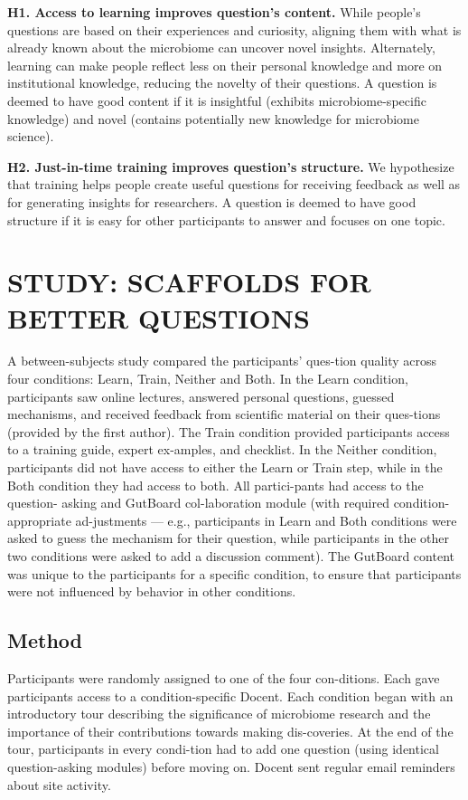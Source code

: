 \textbf{H1. Access to learning improves question’s content.}
While people’s questions are based on their experiences and curiosity, aligning them with what is already known about the microbiome can uncover novel insights. Alternately, learning can make people reflect less on their personal knowledge and more on institutional knowledge, reducing the novelty of their questions. A question is deemed to have good content if it is insightful (exhibits microbiome-specific knowledge) and novel (contains potentially new knowledge for microbiome science).

\textbf{H2. Just-in-time training improves question’s structure.}
We hypothesize that training helps people create useful questions for receiving feedback as well as for generating insights for researchers. A question is deemed to have good structure if it is easy for other participants to answer and focuses on one topic.

\section{STUDY: SCAFFOLDS FOR BETTER QUESTIONS}
A between-subjects study compared the participants’ ques-tion quality across four conditions: Learn, Train, Neither and Both. In the Learn condition, participants saw online lectures, answered personal questions, guessed mechanisms, and received feedback from scientific material on their ques-tions (provided by the first author). The Train condition provided participants access to a training guide, expert ex-amples, and checklist. In the Neither condition, participants did not have access to either the Learn or Train step, while in the Both condition they had access to both. All partici-pants had access to the question- asking and GutBoard col-laboration module (with required condition-appropriate ad-justments — e.g., participants in Learn and Both conditions were asked to guess the mechanism for their question, while participants in the other two conditions were asked to add a discussion comment). The GutBoard content was unique to the participants for a specific condition, to ensure that participants were not influenced by behavior in other conditions. 

\subsection{Method}
Participants were randomly assigned to one of the four con-ditions. Each gave participants access to a condition-specific Docent. Each condition began with an introductory tour describing the significance of microbiome research and the importance of their contributions towards making dis-coveries. At the end of the tour, participants in every condi-tion had to add one question (using identical question-asking modules) before moving on. Docent sent regular email reminders about site activity. 

